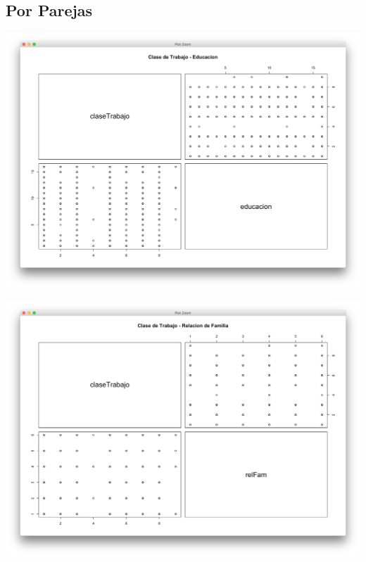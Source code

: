 \documentclass{article}
\begin{document}
\subsection{Por Parejas}
  \begin{center}
    \hbox{\hspace{-5.5em}\includegraphics[scale=0.45]{graficas/ClaseTrabEdu}}
  \end{center}
  \begin{center}
    \hbox{\hspace{-5.5em}\includegraphics[scale=0.45]{graficas/claseTrabjRelSem}}
  \end{center}
\end{document}
